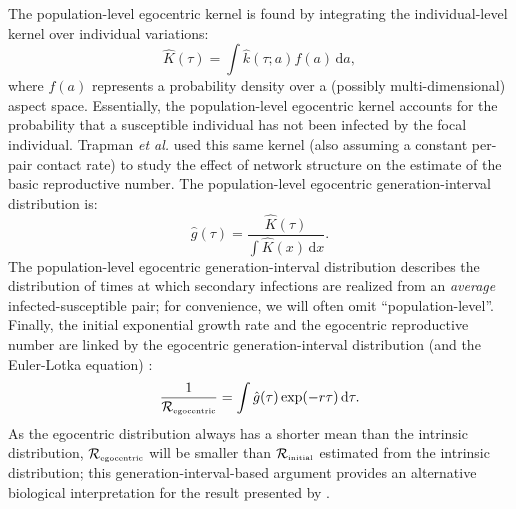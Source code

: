 \documentclass[12pt]{article}
\newcommand{\Rx}[1]{\ensuremath{{\mathcal R}_{#1}}\xspace}
\newcommand{\RR}{\ensuremath{{\mathcal R}}}
\newcommand{\Rini}{\Rx{\textrm{\tiny initial}}}
\newcommand{\Rego}{\Rx{\textrm{\tiny egocentric}}}
\newcommand{\Rhat}{\ensuremath{{\hat\RR}}}
\begin{document}
The population-level egocentric kernel is found by integrating the individual-level kernel over individual variations:
\begin{equation}\label{eq:ego}
\hat{K}(\tau) = \int \hat{k}(\tau; a) f(a) \,\mathrm{d}a,
\end{equation}
where $f(a)$ represents a probability density over a (possibly multi-dimensional) aspect space.
Essentially, the population-level egocentric kernel accounts for the probability that a susceptible individual has not been infected by the focal individual.
Trapman \textit{et al.} \cite{trapman2016inferring} used this same kernel (also assuming a constant per-pair contact rate) to study the effect of network structure on the estimate of the basic reproductive number.
The population-level egocentric generation-interval distribution is:
\begin{equation}
\hat{g}(\tau) = \frac{\hat{K}(\tau)}{\int \hat{K}(x)\,\mathrm{d}x}.
\label{eq:conditional}
\end{equation}
The population-level egocentric generation-interval distribution describes the distribution of times at which secondary infections are realized from an \emph{average} infected-susceptible pair; for convenience, we will often omit ``population-level''.
Finally, the initial exponential growth rate and the egocentric reproductive number are linked by the egocentric generation-interval distribution (and the Euler-Lotka equation) \citep{trapman2016inferring}:
\begin{equation}
\frac{1}{\Rego} = \int \hat{g}(\tau) \exp(-r \tau)\,\mathrm{d}\tau.
\label{eq:egorR}
\end{equation}
As the egocentric distribution always has a shorter mean than the intrinsic distribution, $\Rego$ will be smaller than $\Rini$ estimated from the intrinsic distribution;
this generation-interval-based argument provides an alternative biological interpretation for the result presented by \cite{trapman2016inferring}.
\end{document}
